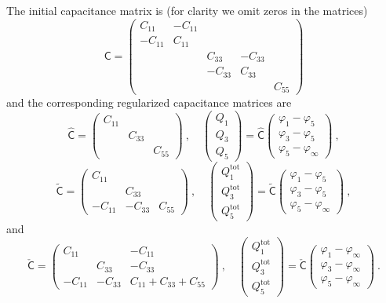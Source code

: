 \documentclass[12pt]{iopart}
\newcommand{\qqd}{\ , \quad}
\newcommand{\be}{\begin{equation}}
\newcommand{\ee}{\end{equation}}
\newcommand{\mx}[1]{\bm{\mathsf{#1}}}
\newcommand{\0}{\vct{0}}
\theoremstyle{plain} \newtheorem{tm}{Theorem}[section]
\theoremstyle{plain} \newtheorem{lm}[tm]{Lemma}
\theoremstyle{definition} \newtheorem{defn}[tm]{Definition}
\begin{document}
\noindent
The initial capacitance matrix is (for clarity we omit zeros in the matrices)
\be
\mx{C} = \begin{pmatrix} C_{11} & -C_{11} & & & \\ -C_{11} & C_{11} & & & \\ & & C_{33} & -C_{33} & \\ & & -C_{33} & C_{33} & \\ & & & & C_{55} \end{pmatrix}
\ee
and the corresponding regularized capacitance matrices are 
\be
\mx{\widehat{C}} = \begin{pmatrix} C_{11} & & \\ & C_{33} & \\ & & C_{55} \end{pmatrix} \qqd \begin{pmatrix} Q_1 \\ Q_3 \\ Q_5 \end{pmatrix} = \mx{\widehat{C}} \begin{pmatrix} \varphi_1 - \varphi_5 \\ \varphi_3 - \varphi_5 \\ \varphi_5 - \varphi_\infty \end{pmatrix} \ ,
\ee
\be
\mx{\widetilde{C}} = \begin{pmatrix} C_{11} & & \\ & C_{33} & \\ -C_{11} & -C_{33} & C_{55} \end{pmatrix} \qqd \begin{pmatrix} Q^{\mathrm{tot}}_1 \\ Q^{\mathrm{tot}}_3 \\ Q^{\mathrm{tot}}_5 \end{pmatrix} = \mx{\widetilde{C}} \begin{pmatrix} \varphi_1 - \varphi_5 \\ \varphi_3 - \varphi_5 \\ \varphi_5 - \varphi_\infty \end{pmatrix} \ ,
\ee
and
\be
\mx{\check{C}} = \begin{pmatrix} C_{11} & & -C_{11} \\ & C_{33} & -C_{33} \\ -C_{11} & -C_{33} & C_{11} + C_{33} + C_{55} \end{pmatrix} \qqd \begin{pmatrix} Q^{\mathrm{tot}}_1 \\ Q^{\mathrm{tot}}_3 \\ Q^{\mathrm{tot}}_5 \end{pmatrix} = \mx{\check{C}} \begin{pmatrix} \varphi_1 - \varphi_\infty \\ \varphi_3 - \varphi_\infty \\ \varphi_5 - \varphi_\infty \end{pmatrix} \ .
\ee
\end{document}
